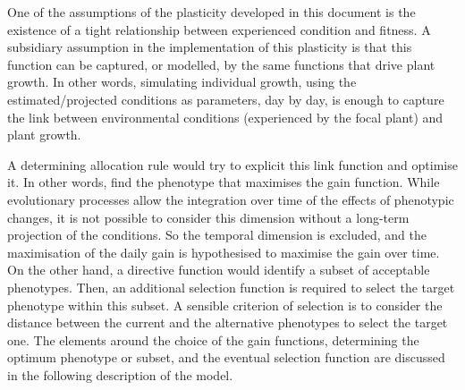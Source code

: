 

One of the assumptions of the plasticity developed in this document is the existence of a tight relationship between experienced condition and fitness. A subsidiary assumption in the implementation of this plasticity is that this function can be captured, or modelled, by the same functions that drive plant growth. In other words, simulating individual growth, using the estimated/projected conditions as parameters, day by day, is enough to capture the link between environmental conditions (experienced by the focal plant) and plant growth. 

A determining allocation rule would try to explicit this link function and optimise it. In other words, find the phenotype that maximises the gain function. While evolutionary processes allow the integration over time of the effects of phenotypic changes, it is not possible to consider this dimension without a long-term projection of the conditions. So the temporal dimension is excluded, and the maximisation of the daily gain is hypothesised to maximise the gain over time. On the other hand, a directive function would identify a subset of acceptable phenotypes. Then, an additional selection function is required to select the target phenotype within this subset. A sensible criterion of selection is to consider the distance between the current and the alternative phenotypes to select the target one. The elements around the choice of the gain functions, determining the optimum phenotype or subset, and the eventual selection function are discussed in the following description of the model.


